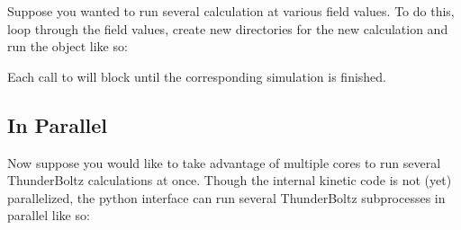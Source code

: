 \documentclass[letterpaper,10pt,english,openany,oneside]{sphinxmanual}
\begin{document}
\sphinxAtStartPar
Suppose you wanted to run several calculation at various
field values. To do this, loop through the field values,
create new directories for the new calculation and run the
object like so:

\begin{sphinxVerbatim}[commandchars=\\\{\}]
 
 


  

  \PYG{p}{[}  \PYG{p}{]}
   
       
     
\end{sphinxVerbatim}

\sphinxAtStartPar
Each call to {\hyperref[\detokenize{api/pytb.ThunderBoltz.run:pytb.ThunderBoltz.run}]{}} will block until the
corresponding simulation is finished.


\subsection{In Parallel}
\label{\detokenize{multi_guide:in-parallel}}
\sphinxAtStartPar
Now suppose you would like to take advantage of multiple cores to run
several ThunderBoltz calculations at once. Though the internal kinetic
code is not (yet) parallelized, the python interface can run several
ThunderBoltz subprocesses in parallel like so:
\end{document}
